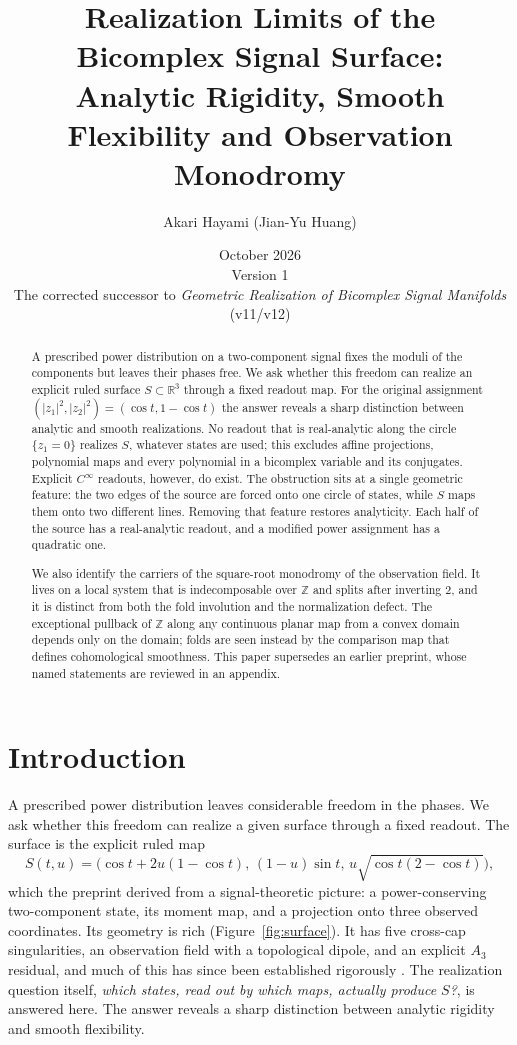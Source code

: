 \documentclass[11pt]{article}
\title{Realization Limits of the Bicomplex Signal Surface:\\
Analytic Rigidity, Smooth Flexibility and Observation Monodromy}
\author{Akari Hayami (Jian-Yu Huang)}
\date{October 2026\\\small Version 1\\\small The corrected successor to
\emph{Geometric Realization of Bicomplex Signal Manifolds} (v11/v12)}
\theoremstyle{definition}\newtheorem{definition}[theorem]{Definition}
\theoremstyle{remark}\newtheorem{remark}[theorem]{Remark}
\newcommand{\R}{\mathbb R}\newcommand{\C}{\mathbb C}\newcommand{\Z}{\mathbb Z}
\begin{document}
\maketitle
\begin{abstract}
A prescribed power distribution on a two-component signal fixes the moduli of
the components but leaves their phases free. We ask whether this freedom can
realize an explicit ruled surface $S\subset\R^3$ through a fixed readout map.
For the original assignment $(|z_1|^2,|z_2|^2)=(\cos t,1-\cos t)$ the answer
reveals a sharp distinction between analytic and smooth realizations. No
readout that is real-analytic along the circle $\{z_1=0\}$ realizes $S$,
whatever states are used; this excludes affine projections, polynomial maps
and every polynomial in a bicomplex variable and its conjugates. Explicit
$C^\infty$ readouts, however, do exist. The obstruction sits at a single
geometric feature: the two edges of the source are forced onto one circle of
states, while $S$ maps them onto two different lines. Removing that feature
restores analyticity. Each half of the source has a real-analytic readout,
and a modified power assignment has a quadratic one.

We also identify the carriers of the square-root monodromy of the observation
field. It lives on a local system that is indecomposable over $\Z$ and splits
after inverting $2$, and it is distinct from both the fold involution and the
normalization defect. The exceptional pullback of $\Z$ along any continuous
planar map from a convex domain depends only on the domain; folds are seen
instead by the comparison map that defines cohomological smoothness. This
paper supersedes an earlier preprint, whose named statements are reviewed in
an appendix.
\end{abstract}
\tableofcontents

\section{Introduction}\label{sec:intro}
A prescribed power distribution leaves considerable freedom in the phases. We
ask whether this freedom can realize a given surface through a fixed readout.
The surface is the explicit ruled map
\[
 S(t,u)=\bigl(\cos t+2u(1-\cos t),\,(1-u)\sin t,\,u\sqrt{\cos t(2-\cos t)}\bigr),
\]
which the preprint \cite{record} derived from a signal-theoretic picture: a
power-conserving two-component state, its moment map, and a projection onto
three observed coordinates. Its geometry is rich (Figure~\ref{fig:surface}).
It has five cross-cap singularities, an observation field with a topological
dipole, and an explicit $A_3$ residual, and much of this has since been
established rigorously \cite{ruled,stokes}. The realization question itself,
\emph{which states, read out by which maps, actually produce $S$?}, is
answered here. The answer reveals a sharp distinction between analytic
rigidity and smooth flexibility.
\end{document}
